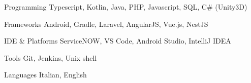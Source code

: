 


\begin{cvskills}


\cvskill
{Programming} %
{Typescript, Kotlin, Java, PHP, Javascript, SQL, C\# (Unity3D)} %


\cvskill
{Frameworks} %
{Android, Gradle, Laravel, AngularJS, Vue.js, NestJS} %


\cvskill
{IDE \& Platforms} %
{ServiceNOW, VS Code, Android Studio, IntelliJ IDEA} %


\cvskill
{Tools} %
{Git, Jenkins, Unix shell} %


\cvskill
{Languages} %
{Italian, English} %


\end{cvskills}